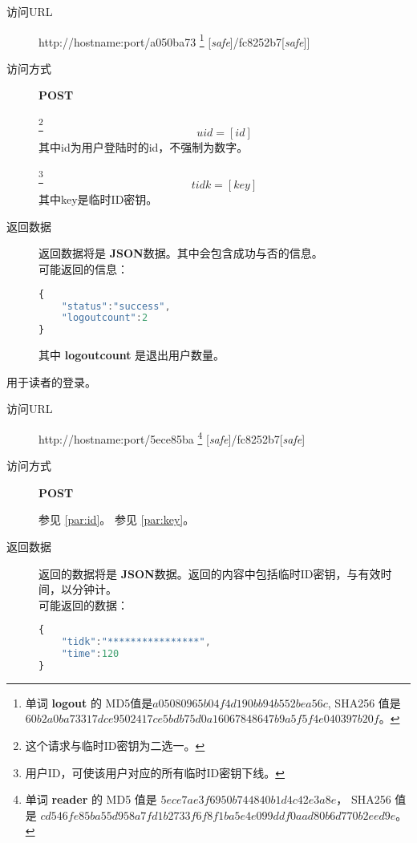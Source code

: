 \documentclass[UTF8]{article}
\def\safe{[\textit{safe}]}
\def\POST{\textbf{POST}}
\def\bfJSON{\textbf{JSON}}
\def\viaurl#1{\item[访问URL] #1}
\def\viareq#1{\item[访问方式] #1}
\def\rtdata{\item[返回数据]}
\begin{document}
    \begin{description}
        \viaurl http://hostname:port/a050ba73
        \footnote{
            单词 \textbf{logout} 的
            MD5值是$a05080965b04f4d190bb94b552bea56c $,
            SHA256 值是
            $60b2a0ba73317dce9502417ce5bdb75d0a16067848647b9a5f5f4e040397b20f$。
        }
        \safe/fc8252b7\safe]

        \viareq \POST

        \label{par:logout:id}
        \footnote{这个请求与临时ID密钥为二选一。}
        $$uid=[id]$$
        其中id为用户登陆时的id，不强制为数字。

        \label{par:logout:tidk}
        \footnote{用户ID，可使该用户对应的所有临时ID密钥下线。}
        $$tidk=[key]$$
        其中key是临时ID密钥。

        \rtdata 返回数据将是 \bfJSON 数据。其中会包含成功与否的信息。
        \\可能返回的信息：
        \begin{lstlisting}[language=JavaScript]
{
    "status":"success",
    "logoutcount":2
}
        \end{lstlisting}\label{par:logout:example}
        其中 \textbf{logoutcount} 是退出用户数量。
    \end{description}






		用于读者的登录。
		\begin{description}

		\viaurl http://hostname:port/5ece85ba
        \footnote{单词 \textbf{reader} 的
            MD5 值是
            $5ece7ae3f6950b744840b1d4c42e3a8e$，
            SHA256 值是
            $cd546fe85ba55d958a7fd1b2733f6f8f1ba5e4e099ddf0aad80b6d770b2eed9e$。
            }
        \safe/fc8252b7\safe

        \viareq \POST

         参见 \ref{par:id}。
         参见 \ref{par:key}。
        \rtdata 返回的数据将是 \bfJSON 数据。返回的内容中包括临时ID密钥，与有效时间，以分钟计。
        \\可能返回的数据：
        \begin{lstlisting}[language=JavaScript]
{
    "tidk":"****************",
    "time":120
}
        \end{lstlisting}
		\end{description}
\end{document}
